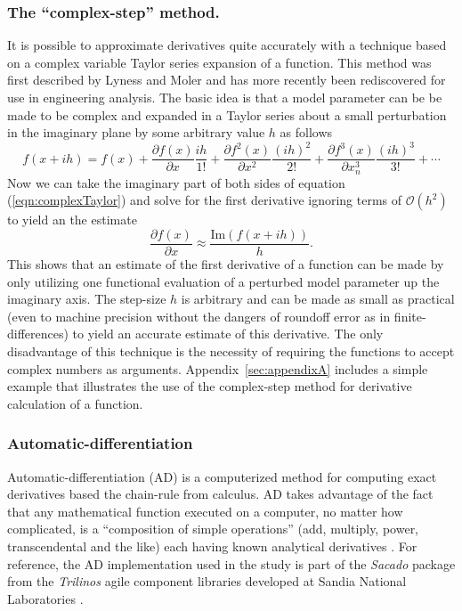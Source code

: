 \documentclass[preprint,12pt]{elsarticle}
\begin{document}
\subsubsection{The ``complex-step'' method.}  
\label{sec:CSmethod}
It is possible to approximate derivatives quite accurately with a technique based on a complex variable Taylor series expansion of a function.  This method was first described by Lyness and Moler \cite{lyness1967numerical, lyness1968differentiation} and has more recently been rediscovered \cite{squire1998using, voorhees2011complex, al2010complex} for use in engineering analysis.  The basic idea is that a model parameter can be be made to be complex and expanded in a Taylor series about a small perturbation in the imaginary plane by some arbitrary value $h$ as follows
%
\begin{equation}
f ( x + i h ) = f (x) + \frac{\partial f(x)}{\partial x} \frac{i h}{1!} + \frac{\partial f^2(x)}{\partial x^2} \frac{(i h)^2}{2!} + \frac{\partial f^3(x)}{\partial x_n^3} \frac{(i h)^3}{3!} + \cdots
\label{eqn:complexTaylor}
\end{equation}
%
Now we can take the imaginary part of both sides of equation (\ref{eqn:complexTaylor}) and solve for the first derivative ignoring terms of $\mathcal{O}\left ( h^2 \right)$ to yield an the estimate
%
\begin{equation}
 \frac{\partial f( x )}{\partial x} \approx \frac{\mbox{Im} \left( f (x + i h) \right)}{h}.
\label{eqn:complexFirstDeriv}
\end{equation}
%
This shows that an estimate of the first derivative of a function can be made by only utilizing one functional evaluation of a perturbed model parameter up the imaginary axis.  The step-size $h$ is arbitrary and can be made as small as practical (even to machine precision without the dangers of roundoff error as in finite-differences) to yield an accurate estimate of this derivative.  The only disadvantage of this technique is the necessity of requiring the functions to accept complex numbers as arguments. Appendix~\ref{sec:appendixA} includes a simple example that illustrates the use of the complex-step method for derivative calculation of a function. 


\subsubsection{Automatic-differentiation} 
\label{ADsubsection}

Automatic-differentiation (AD) is a computerized method for computing exact derivatives based the chain-rule from calculus. AD takes advantage of the fact that any mathematical function executed on a computer, no matter how complicated, is a ``composition of simple operations'' (add, multiply, power, transcendental and the like) each having known analytical derivatives \cite{ref-sacado-presentation}. For reference, the AD implementation used in the study is part of the \emph{Sacado} package from the \emph{Trilinos} agile component libraries developed at Sandia National Laboratories \cite{ref-Sacado}.
\end{document}
